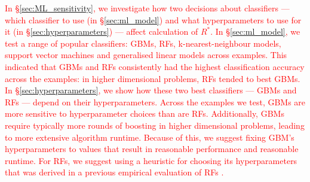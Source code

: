 \documentclass{article}
\begin{document}
\textcolor{red}{In \S\ref{sec:ML_sensitivity}, we investigate how two decisions about classifiers — which classifier to use (in \S\ref{sec:ml_model}) and what hyperparameters to use for it (in \S\ref{sec:hyperparameters}) — affect calculation of $R^*$. In \S\ref{sec:ml_model}, we test a range of popular classifiers: GBMs, RFs, k-nearest-neighbour models, support vector machines and generalised linear models across examples. This indicated that GBMs and RFs consistently had the highest classification accuracy across the examples: in higher dimensional problems, RFs tended to best GBMs. In \S\ref{sec:hyperparameters}, we show how these two best classifiers — GBMs and RFs — depend on their hyperparameters. Across the examples we test, GBMs are more sensitive to hyperparameter choices than are RFs. Additionally, GBMs require typically more rounds of boosting in higher dimensional problems, leading to more extensive algorithm runtime. Because of this, we suggest fixing GBM's hyperparameters to values that result in reasonable performance and reasonable runtime. For RFs, we suggest using a heuristic for choosing its hyperparameters that was derived in a previous empirical evaluation of RFs \citep{bernard2009influence}.}
\end{document}
